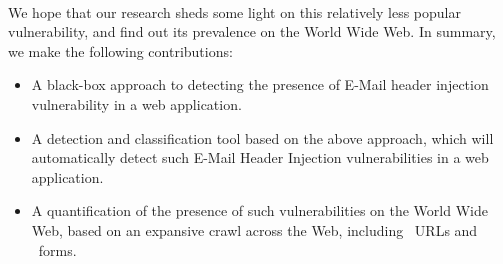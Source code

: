\paragraph{} %
We hope that our research sheds some light on this relatively less popular vulnerability, and find out its prevalence on the World Wide Web. In summary, we make the following contributions:
\begin{itemize}
	
	\item{A black-box approach to detecting the presence of E-Mail header injection vulnerability in a web application.}
	
	\item{A detection and classification tool based on the above approach, which will automatically detect such E-Mail Header Injection vulnerabilities in a web application.}
	
	\item{A quantification of the presence of such vulnerabilities on the World Wide Web, based on an expansive crawl across the Web, including \urls\ URLs and \forms\ forms.}
	
\end{itemize}

\paragraph{}